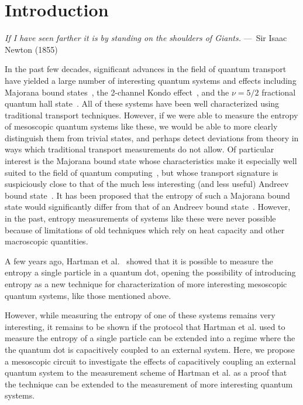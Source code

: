 
\chapter{Introduction}
\label{ch:Introduction}

\begin{epigraph}
    \emph{If I have seen farther it is by standing on the shoulders of
    Giants.} ---~Sir Isaac Newton (1855)
\end{epigraph}

In the past few decades, significant advances in the field of quantum transport have yielded a large number of interesting quantum systems and effects including Majorana bound states~\cite{frolovmajorana}, the 2-channel Kondo effect~\cite{goldhaber-2ck}, and the $\nu = 5/2$ fractional quantum hall state~\cite{Eisenstein5_2}. All of these systems have been well characterized using traditional transport techniques. However, if we were able to measure the entropy of mesoscopic quantum systems like these, we would be able to more clearly distinguish them from trivial states, and perhaps detect deviations from theory in ways which traditional transport measurements do not allow. Of particular interest is the Majorana bound state whose characteristics make it especially well suited to the field of quantum computing~\cite{simon, kitaev}, but whose transport signature is suspiciously close to that of the much less interesting (and less useful) Andreev bound state~\cite{frolov_mirage}. It has been proposed that the entropy of such a Majorana bound state would significantly differ from that of an Andreev bound state~\cite{majorana_fractional}. However, in the past, entropy measurements of systems like these were never possible because of limitations of old techniques which rely on heat capacity and other macroscopic quantities.

A few years ago, Hartman et al.~\cite{nikentropy} showed that it is possible to measure the entropy a single \spinh particle in a quantum dot, opening the possibility of introducing entropy as a new technique for characterization of more interesting mesoscopic quantum systems, like those mentioned above.  

However, while measuring the entropy of one of these systems remains very interesting, it remains to be shown if the protocol that Hartman et al. used to measure the entropy of a single \spinh particle can be extended into a regime where the the quantum dot is capacitively coupled to an external system. Here, we propose a mesoscopic circuit to investigate the effects of capacitively coupling an external quantum system to the measurement scheme of Hartman et al. as a proof that the technique can be extended to the measurement of more interesting quantum systems.
\endinput

Any text after an \endinput is ignored.
You could put scraps here or things in progress.
